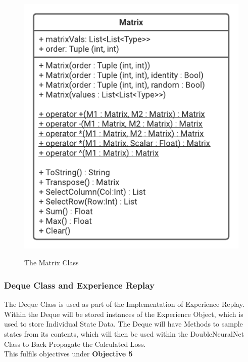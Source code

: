 \begin{flushleft}
                \begin{figure}[H]
                    \centering
                    \includegraphics[width=.55\textwidth]{Images/Design/Classes/Matrix.png} \\
                    \caption*{The Matrix Class}
                \end{figure}
            \subsubsection{Deque Class and Experience Replay}
                The Deque Class is used as part of the Implementation of Experience Replay. Within the Deque will be stored instances
                of the Experience Object, which is used to store Individual State Data. The Deque will have Methods to sample states from
                its contents, which will then be used within the DoubleNeuralNet Class to Back Propagate the Calculated Loss.\\
                \vspace{0.2cm}
                This fulfils objectives under \textbf{Objective 5} \\
            

\end{flushleft}
